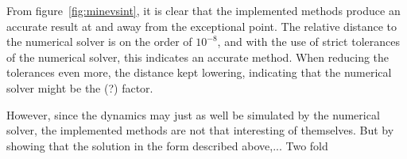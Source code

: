 \documentclass[../main.tex]{subfiles}
\begin{document}
From figure~\ref{fig:minevsint}, it is clear that the implemented methods produce an accurate result at and away from the exceptional point. The relative distance to the numerical solver is on the order of $10^{-8}$, and with the use of strict tolerances of the numerical solver, this indicates an accurate method. When reducing the tolerances even more, the distance kept lowering, indicating that the numerical solver might be the (?) factor.

However, since the dynamics may just as well be simulated by the numerical solver, the implemented methods are not that interesting of themselves. But by showing that the solution in the form described above,... Two fold 
\end{document}
